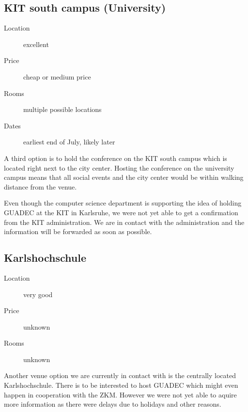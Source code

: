 \vspace*{6cm}

\subsection{KIT south campus (University)}%

\begin{description}
\item[Location] excellent
\item[Price] cheap or medium price
\item[Rooms] multiple possible locations
\item[Dates] earliest end of July, likely later
\end{description}

A third option is to hold the conference on the KIT south campus which is
located right next to the city center. Hosting the conference on the university
campus means that all social events and the city center would be within walking
distance from the venue.

Even though the computer science department is supporting the idea of holding
GUADEC at the KIT in Karlsruhe, we were not yet able to get a confirmation from
the KIT administration. We are in contact with the administration and the
information will be forwarded as soon as possible.

\subsection{Karlshochschule}
\begin{description}
\item[Location] very good
\item[Price] unknown
\item[Rooms] unknown
\end{description}

Another venue option we are currently in contact with is the centrally
located Karlshochschule. There is to be interested to host GUADEC which
might even happen in cooperation with the ZKM. However we were not yet able
to aquire more information as there were delays due to holidays and other reasons.

